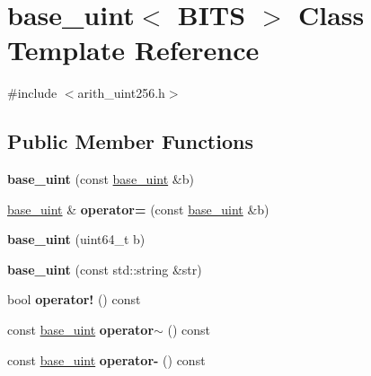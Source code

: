 \hypertarget{classbase__uint}{}\section{base\+\_\+uint$<$ B\+I\+TS $>$ Class Template Reference}
\label{classbase__uint}


{\ttfamily \#include $<$arith\+\_\+uint256.\+h$>$}

\subsection*{Public Member Functions}
\begin{DoxyCompactItemize}
\item 
\mbox{\label{classbase__uint_a5d4e4c28c82c3a12b3689860081579c1}} 
{\bfseries base\+\_\+uint} (const \mbox{\hyperlink{classbase__uint}{base\+\_\+uint}} \&b)
\item 
\mbox{\label{classbase__uint_a0425a3c4d342b6fc9a68b1766cee9ede}} 
\mbox{\hyperlink{classbase__uint}{base\+\_\+uint}} \& {\bfseries operator=} (const \mbox{\hyperlink{classbase__uint}{base\+\_\+uint}} \&b)
\item 
\mbox{\label{classbase__uint_a217f9750f0ca9cdeefffb7bb1f1952d6}} 
{\bfseries base\+\_\+uint} (uint64\+\_\+t b)
\item 
\mbox{\label{classbase__uint_aa1ebaba47302da3e120879d186355736}} 
{\bfseries base\+\_\+uint} (const std\+::string \&str)
\item 
\mbox{\label{classbase__uint_afbcdb1cf849d37272b4e7d4fabf1192b}} 
bool {\bfseries operator!} () const
\item 
\mbox{\label{classbase__uint_a2803d039b33d5570f47ac39d797bc9ea}} 
const \mbox{\hyperlink{classbase__uint}{base\+\_\+uint}} {\bfseries operator$\sim$} () const
\item 
\mbox{\label{classbase__uint_a3b758876b828c6faffdc2a2880122595}} 
const \mbox{\hyperlink{classbase__uint}{base\+\_\+uint}} {\bfseries operator-\/} () const
\item 
\mbox{\label{classbase__uint_ac989d44cd0d60e6c510722a714b817fa}} 

\end{DoxyCompactItemize}
